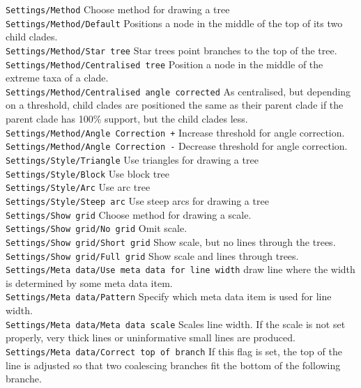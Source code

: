 \documentclass{article}
\begin{document}
\noindent
{\tt Settings/Method} Choose method for drawing a tree\\
{\tt Settings/Method/Default} Positions a node in the middle of the top of its two child clades.\\
{\tt Settings/Method/Star tree} Star trees point branches to the top of the tree.\\
{\tt Settings/Method/Centralised tree} Position a node in the middle of the extreme taxa of a clade.\\
{\tt Settings/Method/Centralised angle corrected} As centralised, but depending on a threshold, child clades
are positioned the same as their parent clade if the parent clade has 100\% support, but the child clades
less.\\
{\tt Settings/Method/Angle Correction +} Increase threshold for angle correction.\\
{\tt Settings/Method/Angle Correction -} Decrease threshold for angle correction.\\

\noindent
{\tt Settings/Style/Triangle} Use triangles for drawing a tree\\
{\tt Settings/Style/Block} Use block tree\\
{\tt Settings/Style/Arc} Use arc tree\\
{\tt Settings/Style/Steep arc} Use steep arcs for drawing a tree\\

\noindent
{\tt Settings/Show grid} Choose method for drawing a scale.\\
{\tt Settings/Show grid/No grid} Omit scale.\\
{\tt Settings/Show grid/Short grid} Show scale, but no lines through the trees.\\
{\tt Settings/Show grid/Full grid} Show scale and lines through trees.\\

\noindent
{\tt Settings/Meta data/Use meta data for line width} draw line where the width is determined by some meta data item.\\
{\tt Settings/Meta data/Pattern} Specify which meta data item is used for line width.\\
{\tt Settings/Meta data/Meta data scale} Scales line width. If the scale is not set properly, very thick lines or uninformative small lines are produced.\\
{\tt Settings/Meta data/Correct top of branch} If this flag is set, the top of the line is adjusted so that two coalescing branches fit the bottom of the following branche.\\
\end{document}
